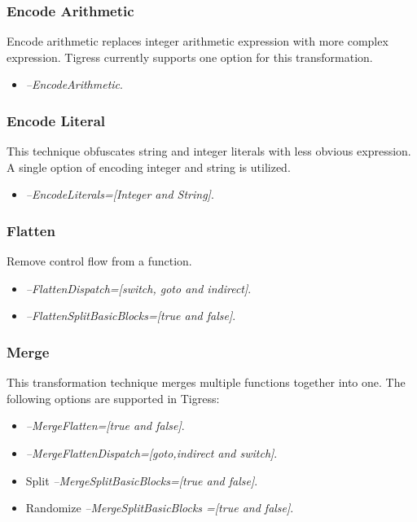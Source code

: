 \subsubsection{Encode Arithmetic}
Encode arithmetic replaces integer arithmetic expression with more complex expression. Tigress currently supports one option for this transformation.

\begin{itemize}
\item \textit{--EncodeArithmetic}.
\end{itemize}


\subsubsection{Encode Literal}
This technique obfuscates string and integer literals with less obvious expression. A single option of encoding integer and string is utilized.

\begin{itemize}
\item \textit{--EncodeLiterals=[Integer and String]}.
\end{itemize}

\subsubsection{Flatten}
Remove control flow from a function.

\begin{itemize}
\item \textit{--FlattenDispatch=[switch, goto and indirect]}.
\item \textit{--FlattenSplitBasicBlocks=[true and false]}.
\end{itemize}



\subsubsection{Merge}
This transformation technique merges multiple functions together into one. The following options are supported in Tigress: 

\begin{itemize}
\item \textit{--MergeFlatten=[true and false]}.
\item \textit{--MergeFlattenDispatch=[goto,indirect and switch]}.
\item Split \textit{--MergeSplitBasicBlocks=[true and false]}.
\item Randomize \textit{--MergeSplitBasicBlocks	=[true and false]}.
\end{itemize}


